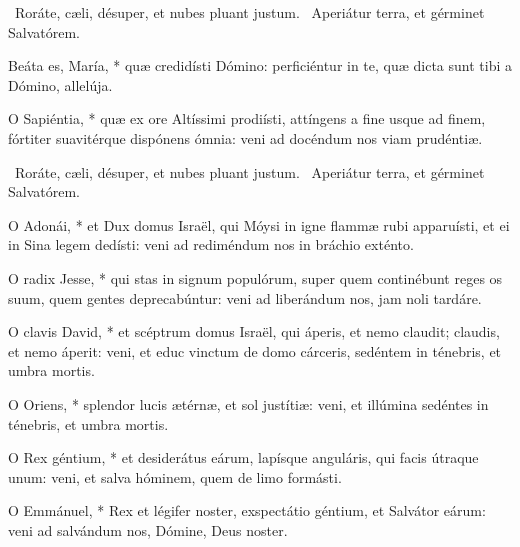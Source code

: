 \V\ Roráte, cæli, désuper, et nubes pluant justum. \R\ Aperiátur terra, et gérminet Salvatórem.

 Beáta es, María, * quæ credidísti Dómino: perficiéntur in te, quæ dicta sunt tibi a Dómino, allelúja.




  O Sapiéntia, * quæ ex ore Altíssimi prodiísti, attíngens a fine usque ad finem, fórtiter suavitérque dispónens ómnia: veni ad docéndum nos viam prudéntiæ.

\V\ Roráte, cæli, désuper, et nubes pluant justum. \R\ Aperiátur terra, et gérminet Salvatórem.


  O Adonái, * et Dux domus Israël, qui Móysi in igne flammæ rubi apparuísti, et ei in Sina legem dedísti: veni ad rediméndum nos in bráchio exténto.

  O radix Jesse, * qui stas in signum populórum, super quem continébunt reges os suum, quem gentes deprecabúntur: veni ad liberándum nos, jam noli tardáre.

  O clavis David, * et scéptrum domus Israël, qui áperis, et nemo claudit; claudis, et nemo áperit: veni, et educ vinctum de domo cárceris, sedéntem in ténebris, et umbra mortis.

  O Oriens, * splendor lucis ætérnæ, et sol justítiæ: veni, et illúmina sedéntes in ténebris, et umbra mortis.

  O Rex géntium, * et desiderátus eárum, lapísque anguláris, qui facis útraque unum: veni, et salva hóminem, quem de limo formásti.

  O Emmánuel, * Rex et légifer noster, exspectátio géntium, et Salvátor eárum: veni ad salvándum nos, Dómine, Deus noster.


